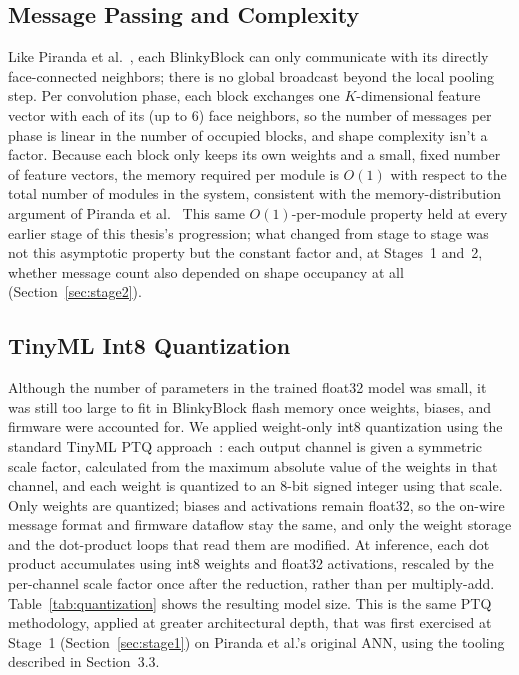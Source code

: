 \documentclass[12pt,a4paper]{report}
\begin{document}
\subsection{Message Passing and Complexity}

Like Piranda et al.~\cite{piranda2024ai4pm}, each BlinkyBlock can only communicate with its directly face-connected neighbors; there is no global broadcast beyond the local pooling step. Per convolution phase, each block exchanges one $K$-dimensional feature vector with each of its (up to 6) face neighbors, so the number of messages per phase is linear in the number of occupied blocks, and shape complexity isn't a factor. Because each block only keeps its own weights and a small, fixed number of feature vectors, the memory required per module is $O(1)$ with respect to the total number of modules in the system, consistent with the memory-distribution argument of Piranda et al.~\cite{piranda2024ai4pm} This same $O(1)$-per-module property held at every earlier stage of this thesis's progression; what changed from stage to stage was not this asymptotic property but the constant factor and, at Stages~1 and~2, whether message count also depended on shape occupancy at all (Section~\ref{sec:stage2}).

\subsection{TinyML Int8 Quantization}
\label{sec:stage6-quant}

Although the number of parameters in the trained float32 model was small, it was still too large to fit in BlinkyBlock flash memory once weights, biases, and firmware were accounted for. We applied weight-only int8 quantization using the standard TinyML PTQ approach~\cite{capogrosso}: each output channel is given a symmetric scale factor, calculated from the maximum absolute value of the weights in that channel, and each weight is quantized to an 8-bit signed integer using that scale. Only weights are quantized; biases and activations remain float32, so the on-wire message format and firmware dataflow stay the same, and only the weight storage and the dot-product loops that read them are modified. At inference, each dot product accumulates using int8 weights and float32 activations, rescaled by the per-channel scale factor once after the reduction, rather than per multiply-add. Table~\ref{tab:quantization} shows the resulting model size. This is the same PTQ methodology, applied at greater architectural depth, that was first exercised at Stage~1 (Section~\ref{sec:stage1}) on Piranda et al.'s original ANN, using the tooling described in Section~3.3.
\end{document}
